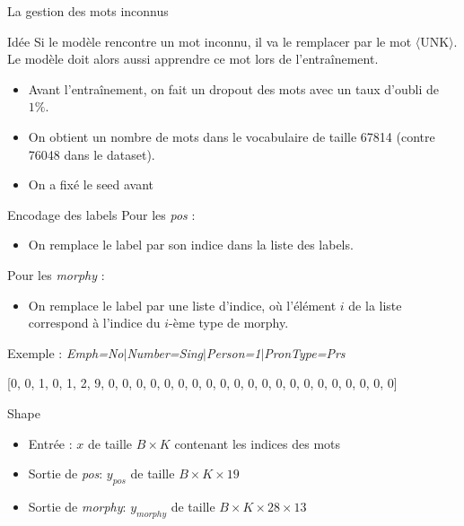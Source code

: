 \documentclass[11pt]{beamer}
\begin{document}
\begin{frame}{La gestion des mots inconnus}
    \begin{exampleblock}{Idée}
        Si le modèle rencontre un mot inconnu, il va le remplacer par le mot $\langle$UNK$\rangle$.
        Le modèle doit alors aussi apprendre ce mot lors de l'entraînement.
    \end{exampleblock}

    \begin{itemize}
        \item Avant l'entraînement, on fait un dropout des mots avec un taux d'oubli de $1\%$.
        \item On obtient un nombre de mots dans le vocabulaire de taille 67814 (contre 76048 dans le dataset).
        \item On a fixé le seed avant
    \end{itemize}
\end{frame}

\begin{frame}{Encodage des labels}
    Pour les \textit{pos} :
    \begin{itemize}
        \item On remplace le label par son indice dans la liste des labels.
    \end{itemize}
    Pour les \textit{morphy} :
    \begin{itemize}
        \item On remplace le label par une liste d'indice, où l'élément $i$ de la liste correspond à l'indice du $i$-ème type de morphy.
    \end{itemize}
    Exemple : \textit{Emph=No$\mid$Number=Sing$\mid$Person=1$\mid$PronType=Prs}

    [0, 0, 1, 0, 1, 2, 9, 0, 0, 0, 0, 0, 0, 0, 0, 0, 0, 0, 0, 0, 0, 0, 0, 0, 0, 0, 0, 0]

    \begin{exampleblock}{Shape}
        \begin{itemize}
            \item Entrée : $x$ de taille $B \times K$ contenant les indices des mots
            \item Sortie de \textit{pos}: $y_{pos}$ de taille $B \times K \times 19$
            \item Sortie de \textit{morphy}: $y_{morphy}$ de taille $B \times K \times 28 \times 13$
        \end{itemize}
    \end{exampleblock}
\end{frame}
\end{document}
